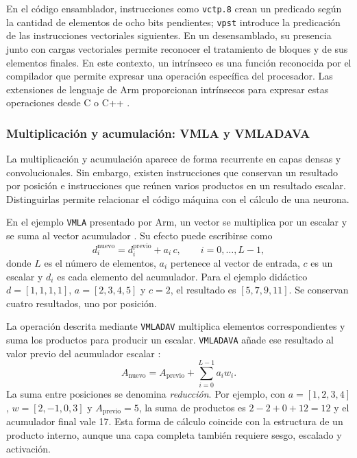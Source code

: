 En el código ensamblador, instrucciones como \texttt{vctp.8} crean un predicado según la cantidad de elementos de ocho bits pendientes; \texttt{vpst} introduce la predicación de las instrucciones vectoriales siguientes. En un desensamblado, su presencia junto con cargas vectoriales permite reconocer el tratamiento de bloques y de sus elementos finales. En este contexto, un intrínseco es una función reconocida por el compilador que permite expresar una operación específica del procesador. Las extensiones de lenguaje de Arm proporcionan intrínsecos para expresar estas operaciones desde C o C++ \cite{cap4_acle}.

\subsubsection{Multiplicación y acumulación: VMLA y VMLADAVA}
La multiplicación y acumulación aparece de forma recurrente en capas densas y convolucionales. Sin embargo, existen instrucciones que conservan un resultado por posición e instrucciones que reúnen varios productos en un resultado escalar. Distinguirlas permite relacionar el código máquina con el cálculo de una neurona.

En el ejemplo \texttt{VMLA} presentado por Arm, un vector se multiplica por un escalar y se suma al vector acumulador \cite{cap4_armvmla}. Su efecto puede escribirse como
\begin{equation}
d_i^{\mathrm{nuevo}}=d_i^{\mathrm{previo}}+a_i\,c,
\qquad i=0,\ldots,L-1,
\label{eq:cap4_vmla}
\end{equation}
donde $L$ es el número de elementos, $a_i$ pertenece al vector de entrada, $c$ es un escalar y $d_i$ es cada elemento del acumulador. Para el ejemplo didáctico $d=[1,1,1,1]$, $a=[2,3,4,5]$ y $c=2$, el resultado es $[5,7,9,11]$. Se conservan cuatro resultados, uno por posición.

La operación descrita mediante \texttt{VMLADAV} multiplica elementos correspondientes y suma los productos para producir un escalar. \texttt{VMLADAVA} añade ese resultado al valor previo del acumulador escalar \cite{cap4_armvmladava}:
\begin{equation}
A_{\mathrm{nuevo}}=A_{\mathrm{previo}}+\sum_{i=0}^{L-1}a_iw_i.
\label{eq:cap4_vmladava}
\end{equation}
La suma entre posiciones se denomina \emph{reducción}. Por ejemplo, con $a=[1,2,3,4]$, $w=[2,-1,0,3]$ y $A_{\mathrm{previo}}=5$, la suma de productos es $2-2+0+12=12$ y el acumulador final vale 17. Esta forma de cálculo coincide con la estructura de un producto interno, aunque una capa completa también requiere sesgo, escalado y activación.

